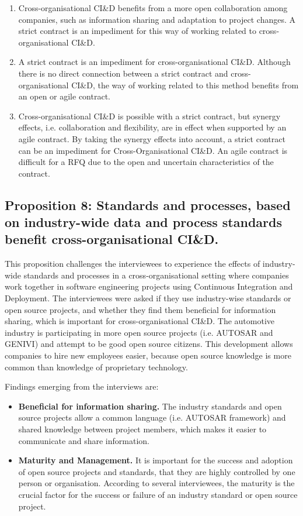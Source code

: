 \begin{enumerate}
\item Cross-organisational CI\&D benefits from a more open collaboration among companies, such as information sharing and adaptation to project changes. A strict contract is an impediment for this way of working related to cross-organisational CI\&D.
\item A strict contract is an impediment for cross-organisational CI\&D. Although there is no direct connection between a strict contract and cross-organisational CI\&D, the way of working related to this method benefits from an open or agile contract.
\item Cross-organisational CI\&D is possible with a strict contract, but synergy effects, i.e. collaboration and flexibility, are in effect when supported by an agile contract. By taking the synergy effects into account, a strict contract can be an impediment for Cross-Organisational CI\&D. An agile contract is difficult for a RFQ due to the open and uncertain characteristics of the contract.
\end{enumerate}


\subsection{Proposition 8: Standards and processes, based on industry-wide data and process standards benefit cross-organisational CI\&D.}

This proposition challenges the interviewees to experience the effects of industry-wide standards and processes in a cross-organisational setting where companies work together in software engineering projects using Continuous Integration and Deployment. The interviewees were asked if they use industry-wise standards or open source projects, and whether they find them beneficial for information sharing, which is important for cross-organisational CI\&D. The automotive industry is participating in more open source projects (i.e. AUTOSAR and GENIVI) and attempt to be good open source citizens. This development allows companies to hire new employees easier, because open source knowledge is more common than knowledge of proprietary technology.

Findings emerging from the interviews are:

\begin{itemize}
\item {\bf Beneficial for information sharing.} The industry standards and open source projects allow a common language (i.e. AUTOSAR framework) and shared knowledge between project members, which makes it easier to communicate and share information.
\item {\bf Maturity and Management.} It is important for the success and adoption of open source projects and standards, that they are highly controlled by one person or organisation. According to several interviewees, the maturity is the crucial factor for the success or failure of an industry standard or open source project.
\end{itemize}

